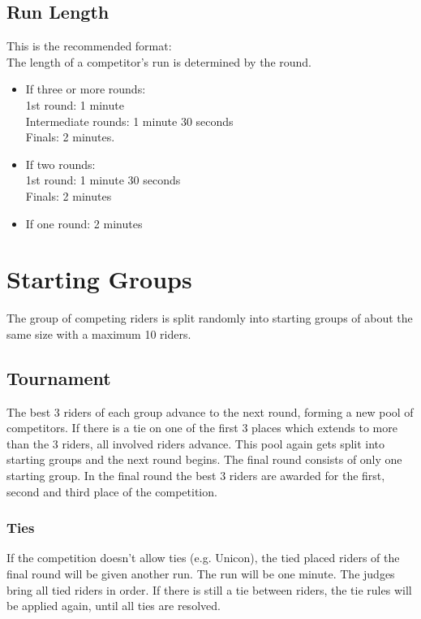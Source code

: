 \subsection{Run Length}
This is the recommended format: \\
The length of a competitor's run is determined by the round.
\begin{itemize}
\item If three or more rounds: \\
1st round: 1 minute \\
Intermediate rounds: 1 minute 30 seconds \\
Finals: 2 minutes.
\item If two rounds: \\
1st round: 1 minute 30 seconds \\
Finals: 2 minutes
\item If one round: 2 minutes
\end{itemize}

\section{Starting Groups}
The group of competing riders is split randomly into starting groups of about the same size with a maximum 10 riders.

\subsection{Tournament}
The best 3 riders of each group advance to the next round, forming a new pool of competitors.
If there is a tie on one of the first 3 places which extends to more than the 3 riders, all involved riders advance.
This pool again gets split into starting groups and the next round begins.
The final round consists of only one starting group.
In the final round the best 3 riders are awarded for the first, second and third place of the competition.

\subsubsection{Ties}
If the competition doesn't allow ties (e.g. Unicon), the tied placed riders of the final round will be given another run.
The run will be one minute.
The judges bring all tied riders in order.
If there is still a tie between riders, the tie rules will be applied again, until all ties are resolved.

